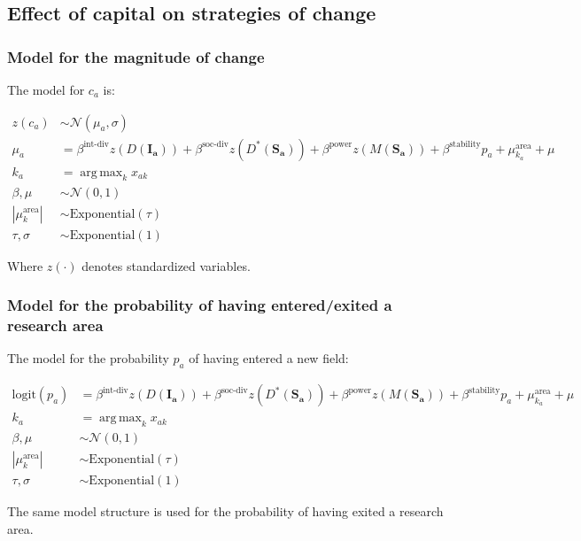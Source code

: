 \documentclass{article}
\DeclareMathOperator*{\argmax}{arg\,max}
\begin{document}
\subsection{Effect of capital on strategies of change}

\subsubsection{\label{appendix:change-model}Model for the magnitude of change}

The model for $c_a$ is:

\begin{align*}
    z(c_a) &\sim \mathcal{N}(\mu_a,\sigma)\\
    \mu_a &= \beta^{\text{int-div}} z(D(\bm{I_a}))+\beta^{\text{soc-div}}z(D^{\ast}(\bm{S_a})) + \beta^{\text{power}} z(M(\bm{S_a})) + \beta^{\text{stability}} p_a   + \mu^{\text{area}}_{k_a} + \mu\\
    k_a &= \argmax_k x_{ak}\\
    \beta,\mu &\sim \mathcal{N}(0, 1)\\
    |\mu^{\text{area}}_k| &\sim \mathrm{Exponential}(\tau)\\
    \tau,\sigma &\sim \mathrm{Exponential}(1)
\end{align*}

Where $z(\cdot)$ denotes standardized variables.

\subsubsection{\label{appendix:enter-exit-model}Model for the probability of having  entered/exited a research area}

The model for the probability $p_a$ of having entered a new field:

\begin{align*}
    \mathrm{logit}(p_a) &= \beta^{\text{int-div}} z(D(\bm{I_a}))+\beta^{\text{soc-div}}z(D^{\ast}(\bm{S_a})) + \beta^{\text{power}} z(M(\bm{S_a})) + \beta^{\text{stability}} p_a   + \mu^{\text{area}}_{k_a} + \mu\\
    k_a &= \argmax_k x_{ak}\\
    \beta,\mu &\sim \mathcal{N}(0, 1)\\
    |\mu^{\text{area}}_k| &\sim \mathrm{Exponential}(\tau)\\
    \tau,\sigma &\sim \mathrm{Exponential}(1)
\end{align*}

The same model structure is used for the probability of having exited a research area.
\end{document}
